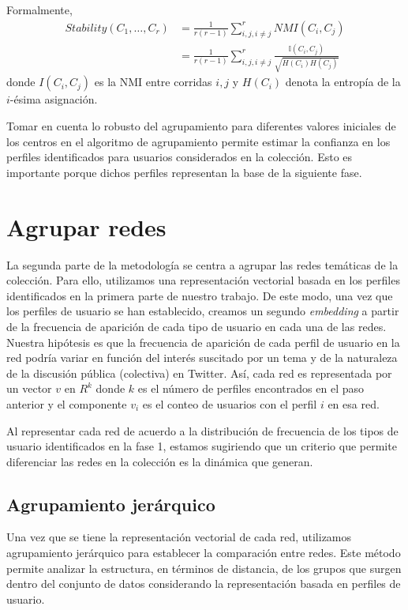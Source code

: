 Formalmente, 
\begin{align}\label{eq:PNMI}
Stability(C_1,\ldots,C_r) &= \frac{1}{r(r-1)}\sum_{i,j,i\not=j}^{r}NMI(C_i,C_j) \\
 &= \frac{1}{r(r-1)}\sum_{i,j,i\not=j}^{r} \frac{\mathbb{I}(C_i,C_j)}{\sqrt{{H}(C_i){H}(C_j)}}
\end{align}
donde ${I}(C_i,C_j)$ es la NMI entre corridas $i,j$ y ${H}(C_i)$ denota la entropía de la $i$-ésima asignación.

Tomar en cuenta lo robusto del agrupamiento para diferentes valores iniciales de los centros en el algoritmo de agrupamiento permite estimar la confianza en los perfiles identificados para usuarios considerados en la colección. Esto es importante porque dichos perfiles representan la base de la siguiente fase. 

\section{Agrupar redes} \label{sec:system:sec3}
La segunda parte de la metodología se centra a agrupar las redes temáticas de la colección. Para ello, utilizamos una representación vectorial basada en los perfiles identificados en la primera parte de nuestro trabajo. De este modo, una vez que los perfiles de usuario se han establecido, creamos un segundo \textit{embedding} a partir de la frecuencia de aparición de cada tipo de usuario en cada una de las redes. 
Nuestra hipótesis es que la frecuencia de aparición de cada perfil de usuario en la red podría variar en función del interés suscitado por un tema y de la naturaleza de la discusión pública (colectiva) en Twitter. Así, cada red es representada por un vector $v$ en ${R}^k$ donde $k$ es el número de perfiles encontrados en el paso anterior y el componente $v_i$ es el conteo de usuarios con el perfil $i$ en esa red. 

Al representar cada red de acuerdo a la distribución de frecuencia de los tipos de usuario identificados en la fase 1, estamos sugiriendo que un criterio que permite diferenciar las redes en la colección es la dinámica que generan. 

\subsection{Agrupamiento jerárquico}
Una vez que se tiene la representación vectorial de cada red, utilizamos agrupamiento jerárquico para establecer la comparación entre redes. Este método permite analizar la estructura, en términos de distancia, de los grupos que surgen dentro del conjunto de datos considerando la representación basada en perfiles de usuario. 

